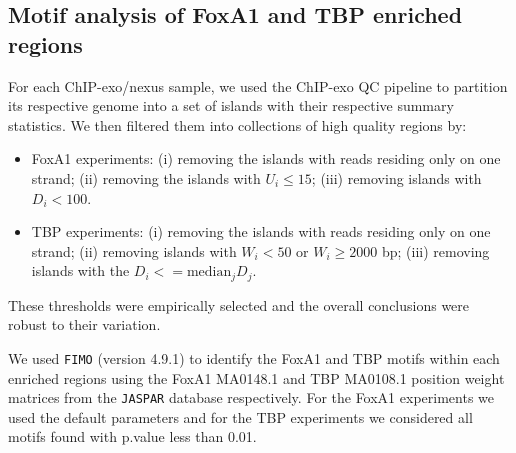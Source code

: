 \documentclass{bmcart}
\newcommand{\SK}[1]{\textcolor{red}{SK: #1}}
\begin{document}


\subsection*{Motif analysis of FoxA1 and TBP enriched regions}

\color{blue}

For each ChIP-exo/nexus sample, we used the ChIP-exo QC pipeline to
partition its respective genome into a set of islands with their
respective summary statistics. We then filtered them into collections
of high quality regions by:


\begin{itemize}
\item FoxA1 experiments: (i) removing the islands with reads residing
  only on one strand; (ii) removing the islands with $U_i \leq 15$;
  (iii) removing islands with $D_i < 100$.
\item TBP experiments: (i) removing the islands with reads residing
  only on one strand; (ii) removing islands with $W_i < 50$ or $W_i
  \geq 2000$ bp; (iii) removing islands with the $D_i <=
  \mbox{median}_j D_j$.
\end{itemize}

These thresholds were empirically selected and the overall conclusions
were robust to their variation.  

We used \texttt{FIMO} (version 4.9.1) \cite{fimo} to identify the
FoxA1 and TBP motifs within each enriched regions using the FoxA1
MA0148.1 and TBP MA0108.1 position weight matrices from the
\texttt{JASPAR} database \cite{jaspar} respectively. For the FoxA1
experiments we used the default parameters and for the TBP experiments
we considered all motifs found with p.value less than 0.01. 

\color{black}

\end{document}
